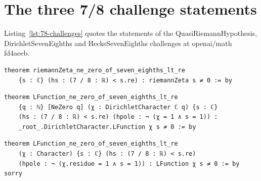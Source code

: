 \section{The three 7/8 challenge statements}\label{app:78-listings}

Listing~\ref{lst:78-challenges} quotes the statements of the QuasiRiemannHypothesis, DirichletSevenEighths and HeckeSevenEighths challenges at openai/math fd4aeeb.

\begin{listing}[tbp]
\caption{The 7/8 challenges at openai/math fd4aeeb: lean/ComparatorChallenges/QuasiRiemannHypothesis.lean:5-6 (sha256 065f8c9a\ldots), DirichletSevenEighths.lean:8-11 (sha256 8fb13ad9\ldots) and HeckeSevenEighths.lean:237-239 (sha256 cb5e404f\ldots).}\label{lst:78-challenges}
\begin{Verbatim}
theorem riemannZeta_ne_zero_of_seven_eighths_lt_re
    {s : ℂ} (hs : (7 / 8 : ℝ) < s.re) : riemannZeta s ≠ 0 := by
\end{Verbatim}
\begin{Verbatim}
theorem LFunction_ne_zero_of_seven_eighths_lt_re
    {q : ℕ} [NeZero q] (χ : DirichletCharacter ℂ q) {s : ℂ}
    (hs : (7 / 8 : ℝ) < s.re) (hpole : ¬ (χ = 1 ∧ s = 1)) :
    _root_.DirichletCharacter.LFunction χ s ≠ 0 := by
\end{Verbatim}
\begin{Verbatim}
theorem LFunction_ne_zero_of_seven_eighths_lt_re
    (χ : Character) {s : ℂ} (hs : (7 / 8 : ℝ) < s.re)
    (hpole : ¬ (χ.residue = 1 ∧ s = 1)) : LFunction χ s ≠ 0 := by sorry
\end{Verbatim}
\end{listing}
